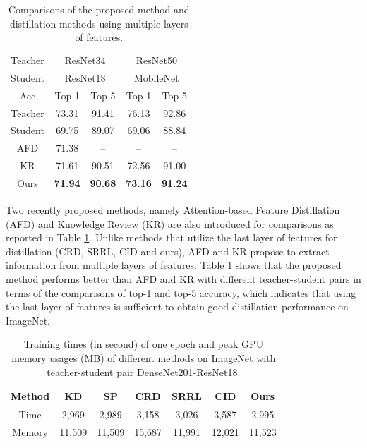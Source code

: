 \documentclass{article}
\begin{document}
\begin{table}
    \setlength{\abovecaptionskip}{-0.41cm}
    \setlength{\belowcaptionskip}{0.2cm}
    \caption{Comparisons of the proposed method and distillation methods using multiple layers of features.}
    \label{crosslayer}
    \centering
    \begin{tabular}{c|cc|cc} 
		\hline
		Teacher &\multicolumn{2}{c|}{ResNet34} &\multicolumn{2}{c}{ResNet50} \\
		Student &\multicolumn{2}{c|}{ResNet18} &\multicolumn{2}{c}{MobileNet} \\
		\hline
		Acc &Top-1  &Top-5 &Top-1  &Top-5   \\ 
		
		\hline 
		Teacher &73.31 &91.41 &76.13 &92.86 \\
		Student &69.75 &89.07 &69.06 &88.84   \\
		AFD &71.38 &-- &-- &--   \\
		KR &71.61 &90.51 &72.56 &91.00   \\
		Ours &\textbf{71.94} &\textbf{90.68} &\textbf{73.16} &\textbf{91.24}    \\
		\hline
    \end{tabular}
\end{table}

Two recently proposed methods, namely Attention-based Feature Distillation (AFD) \cite{afd} and Knowledge Review (KR) \cite{kr} are also introduced for comparisons as reported in Table \ref{crosslayer}. Unlike methods that utilize the last layer of features for distillation (CRD, SRRL, CID and ours), AFD and KR propose to extract information from multiple layers of features. Table \ref{crosslayer} shows that the proposed method performs better than AFD and KR with different teacher-student pairs in terms of the comparisons of top-1 and top-5 accuracy, which indicates that using the last layer of features is sufficient to obtain good distillation performance on ImageNet.





\begin{table}
    \caption{Training times (in second) of one epoch and peak GPU memory usages (MB) of different methods on ImageNet with teacher-student pair DenseNet201-ResNet18.}
    \label{tabletime}
    \centering
    \begin{tabular}{c|cccccc}
    \hline
    Method &KD &SP &CRD &SRRL &CID &Ours\\
    \hline 
    Time &2,969 &2,989 &3,158 &3,026 &3,587 &2,995 \\
    Memory &11,509  &11,509  &15,687  &11,991  &12,021  &11,523   \\
    \hline
    \end{tabular}
\end{table}
\end{document}
